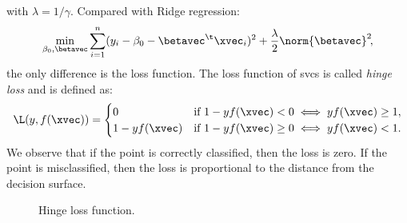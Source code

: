 with $\lambda = 1/\gamma$. Compared with Ridge regression:
\begin{equation}
    \min_{\beta_0, \betavec} \sum_{i=1}^n (y_i - \beta_0 - \betavec^\t\xvec_i)^2 + \frac{\lambda}{2}\norm{\betavec}^2\negthinspace,
\end{equation}
the only difference is the loss function. The loss function of \acsp{svc} is called \emph{hinge loss} and is defined as:
\begin{equation}
    \L(y, f(\xvec)) = \begin{cases}
        0              & \text{if } 1 - y f(\xvec) < 0 \iff yf(\xvec) \geq 1, \\
        1 - y f(\xvec) & \text{if } 1 - y f(\xvec) \geq 0 \iff yf(\xvec) < 1.
    \end{cases}
\end{equation}
We observe that if the point is correctly classified, then the loss is zero. If the point is misclassified, then the loss is proportional to the distance from the decision surface.

\begin{figure}[tb]
    \centering
    \caption{Hinge loss function.}
\end{figure}

